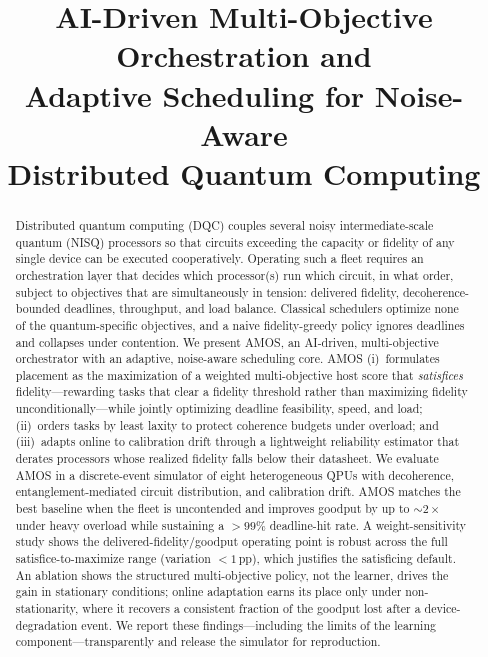 \documentclass[conference]{IEEEtran}
\begin{document}
\title{AI-Driven Multi-Objective Orchestration and\\
Adaptive Scheduling for Noise-Aware\\
Distributed Quantum Computing}

\author{
}

\maketitle

\begin{abstract}
Distributed quantum computing (DQC) couples several noisy intermediate-scale
quantum (NISQ) processors so that circuits exceeding the capacity or fidelity of
any single device can be executed cooperatively. Operating such a fleet requires
an orchestration layer that decides which processor(s) run which circuit, in what
order, subject to objectives that are simultaneously in tension: delivered
fidelity, decoherence-bounded deadlines, throughput, and load balance. Classical
schedulers optimize none of the quantum-specific objectives, and a naive
fidelity-greedy policy ignores deadlines and collapses under contention. We
present AMOS, an AI-driven, multi-objective orchestrator with an adaptive,
noise-aware scheduling core. AMOS (i)~formulates placement as the maximization of
a weighted multi-objective host score that \emph{satisfices} fidelity---rewarding
tasks that clear a fidelity threshold rather than maximizing fidelity
unconditionally---while jointly optimizing deadline feasibility, speed, and load;
(ii)~orders tasks by least laxity to protect coherence budgets under overload;
and (iii)~adapts online to calibration drift through a lightweight reliability
estimator that derates processors whose realized fidelity falls below their
datasheet. We evaluate AMOS in a discrete-event simulator of eight heterogeneous
QPUs with decoherence, entanglement-mediated circuit distribution, and
calibration drift. AMOS matches the best baseline when the fleet is uncontended
and improves goodput by up to $\sim\!2\times$ under heavy overload while
sustaining a $>\!99\%$ deadline-hit rate. A weight-sensitivity study shows the
delivered-fidelity/goodput operating point is robust across the full
satisfice-to-maximize range (variation $<\!1$\,pp), which justifies the
satisficing default. An ablation shows the structured multi-objective policy,
not the learner, drives the gain in stationary conditions; online adaptation
earns its place only under non-stationarity, where it recovers a consistent
fraction of the goodput lost after a device-degradation event. We report these
findings---including the limits of the learning component---transparently and
release the simulator for reproduction.
\end{abstract}
\end{document}
